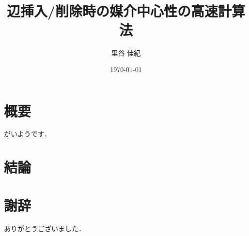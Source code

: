 \documentclass{jreport}
\title{辺挿入/削除時の媒介中心性の高速計算法}
\author{里谷 佳紀}
\date{\today}
\begin{document}
\maketitle

\chapter*{概要}
がいようです．

\tableofcontents






\chapter{結論}

\chapter*{謝辞}
ありがとうございました．

\appendix

\printbibliography[title=参考文献]
\end{document}
